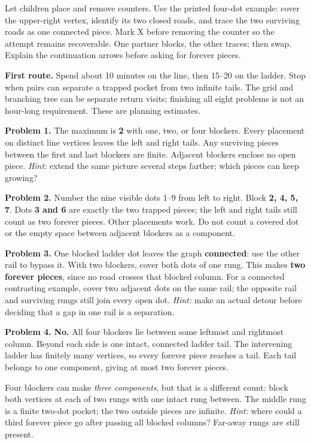 \documentclass[11pt,letterpaper]{article}
\newcommand{\heading}[1]{\par\vspace{5pt}{\large\bfseries #1}\par}
\begin{document}
Let children place and remove counters. Use the printed four-dot example: cover the upper-right vertex, identify its two closed roads, and trace the two surviving roads as one connected piece. Mark X before removing the counter so the attempt remains recoverable. One partner blocks, the other traces; then swap. Explain the continuation arrows before asking for forever pieces.

\textbf{First route.} Spend about 10 minutes on the line, then 15--20 on the ladder. Stop when pairs can separate a trapped pocket from two infinite tails. The grid and branching tree can be separate return visits; finishing all eight problems is not an hour-long requirement. These are planning estimates.

\heading{Numbered answers and hints}
\textbf{Problem 1.} The maximum is \textbf{2} with one, two, or four blockers. Every placement on distinct line vertices leaves the left and right tails. Any surviving pieces between the first and last blockers are finite. Adjacent blockers enclose no open piece. \emph{Hint:} extend the same picture several steps farther; which pieces can keep growing?

\textbf{Problem 2.} Number the nine visible dots 1--9 from left to right. Block \textbf{2, 4, 5, 7}. Dots \textbf{3 and 6} are exactly the two trapped pieces; the left and right tails still count as two forever pieces. Other placements work. Do not count a covered dot or the empty space between adjacent blockers as a component.
\newpage
\heading{Answers continued and the reasons they hold}
\textbf{Problem 3.} One blocked ladder dot leaves the graph \textbf{connected}: use the other rail to bypass it. With two blockers, cover both dots of one rung. This makes \textbf{two forever pieces}, since no road crosses that blocked column. For a connected contrasting example, cover two adjacent dots on the same rail; the opposite rail and surviving rungs still join every open dot. \emph{Hint:} make an actual detour before deciding that a gap in one rail is a separation.

\textbf{Problem 4.} \textbf{No.} All four blockers lie between some leftmost and rightmost column. Beyond each side is one intact, connected ladder tail. The intervening ladder has finitely many vertices, so every forever piece reaches a tail. Each tail belongs to one component, giving at most two forever pieces.

Four blockers can make \emph{three components}, but that is a different count: block both vertices at each of two rungs with one intact rung between. The middle rung is a finite two-dot pocket; the two outside pieces are infinite. \emph{Hint:} where could a third forever piece go after passing all blocked columns? Far-away rungs are still present.
\end{document}
